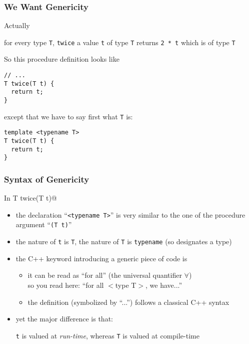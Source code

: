 \documentclass{beamer}
\newcommand{\cpp}{{C++}\xspace}
\newcommand{\kw}[1]{{\color{blue}{\texttt{#1}}}\xspace}
\newcommand{\code}[1]{{\scriptsize{\texttt{#1}}}\xspace}
\begin{document}
\begin{frame}[fragile]
  \frametitle{We Want Genericity}

Actually
\begin{center}
  for every type \code{T}, \code{twice} a value \code{t} of type
  \code{T} returns \code{2 * t} which is of type \code{T}
\end{center}

So this procedure definition looks like
\begin{lstlisting}
// ...
T twice(T t) {
  return t;
}
\end{lstlisting}
except that we have to say first what \code{T} is:
\begin{lstlisting}
template <typename T>
T twice(T t) {
  return t;
}
\end{lstlisting}

\end{frame}


\begin{frame}[fragile]
  \frametitle{Syntax of Genericity}

In  T twice(T t)@
%
\begin{itemize}
\item the declaration ``\code{<typename T>}'' is very similar to the
  one of the procedure argument ``\code{(T t)}''
%
\item the nature of \code{t} is \code{T}, the nature of \code{T} is
  \code{typename} (so designates a type)
%
\item the \cpp keyword introducing a generic piece of code is
  \kw{template}
  \begin{itemize}
  \item it can be read as ``for all'' (the universal quantifier $\forall$)\\
    so you read here: ``for all $<$type T$>$, we have...''
  \item the definition (symbolized by ``...'') follows a classical
    \cpp syntax
  \end{itemize}
%
\item yet the major difference is that:
  \begin{center}
    \code{t} is valued at \emph{run-time}, whereas \code{T} is valued at compile-time
  \end{center}
\end{itemize}

\end{frame}
\end{document}
